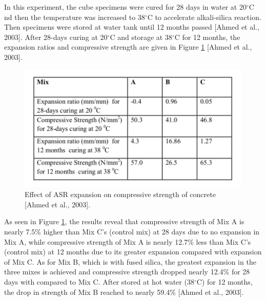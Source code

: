 In this experiment, the cube specimens were cured for 28 days in water at 20$^\circ$C nd then the temperature was increased to 38$^\circ$C to accelerate alkali-silica reaction. Then specimens were stored at water tank until 12 months passed [Ahmed et al., 2003]. After 28-days curing at 20$^\circ$C and storage at 38$^\circ$C for 12 months, the expansion ratios and compressive strength are given in Figure \ref{Ahmed et al., 2003 1} [Ahmed et al., 2003].


\begin{figure}[h!]
  \centering
  \includegraphics[width=0.8\linewidth]{Reference/temp1.png}
  \caption{Effect of ASR expansion on compressive strength of concrete [Ahmed et al., 2003\cite{Ahmed}].}
  \label{Ahmed et al., 2003 1}
\end{figure}

As seen in Figure \ref{Ahmed et al., 2003 1}, the results reveal that compressive strength of Mix A is nearly 7.5\% higher than Mix C's (control mix) at 28 days due to no expansion in Mix A, while compressive strength of Mix A is nearly 12.7\% less than Mix C's (control mix) at 12 months due to its greater expansion compared with expansion of Mix C. As for Mix B, which is with fused silica, the greatest expansion in the three mixes is achieved and compressive strength dropped nearly 12.4\% for 28 days with compared to Mix C. After stored at hot water (38$^\circ$C) for 12 months, the drop in strength of Mix B reached to nearly 59.4\% [Ahmed et al., 2003]\cite{Ahmed}.


